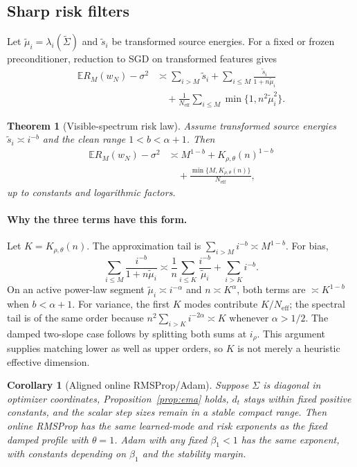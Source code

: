 \documentclass[letterpaper]{article} %
\newtheorem{theorem}{Theorem}
\newtheorem{corollary}{Corollary}
\newcommand{\E}{\mathbb{E}}
\newcommand{\tSig}{\widetilde\Sigma}
\newcommand{\tmu}{\widetilde\mu}
\newcommand{\ts}{\widetilde s}
\newcommand{\Neff}{N_{\mathrm{eff}}}
\newcommand{\Kvis}{K_{\rho,\theta}}
\begin{document}
\subsection{Sharp risk filters}

Let $\tmu_i=\lambda_i(\tSig)$ and $\ts_i$ be transformed source energies.  For a fixed or frozen preconditioner, reduction to SGD on transformed features gives
\begin{equation}
\label{eq:filter-law}
 \begin{aligned}
 \E R_M(w_N)-\sigma^2
 &\asymp \sum_{i>M}\ts_i
 +\sum_{i\le M}\frac{\ts_i}{1+n\tmu_i}\\
 &\quad+\frac1{\Neff}
 \sum_{i\le M}\min\{1,n^2\tmu_i^2\}.
 \end{aligned}
\end{equation}

\begin{theorem}[Visible-spectrum risk law]
\label{thm:risk}
Assume transformed source energies $\ts_i\asymp i^{-b}$ and the clean range $1<b<\alpha+1$.  Then
\[
 \begin{aligned}
 \E R_M(w_N)-\sigma^2
 &\asymp M^{1-b}+\Kvis(n)^{1-b}\\
 &\quad+\frac{\min\{M,\Kvis(n)\}}{\Neff},
 \end{aligned}
\]
up to constants and logarithmic factors.
\end{theorem}

\paragraph{Why the three terms have this form.}
Let $K=\Kvis(n)$.  The approximation tail is
$\sum_{i>M}i^{-b}\asymp M^{1-b}$.  For bias,
\[
 \sum_{i\le M}\frac{i^{-b}}{1+n\tmu_i}
 \asymp
 \frac1n\sum_{i\le K}\frac{i^{-b}}{\tmu_i}
 +\sum_{i>K}i^{-b}.
\]
On an active power-law segment $\tmu_i\asymp i^{-\alpha}$ and $n\asymp K^\alpha$, both terms are $\asymp K^{1-b}$ when $b<\alpha+1$.  For variance, the first $K$ modes contribute $K/\Neff$; the spectral tail is of the same order because
$n^2\sum_{i>K}i^{-2\alpha}\asymp K$ whenever $\alpha>1/2$.  The damped two-slope case follows by splitting both sums at $i_\rho$.  This argument supplies matching lower as well as upper orders, so $K$ is not merely a heuristic effective dimension.

\begin{corollary}[Aligned online RMSProp/Adam]
\label{cor:aligned-online}
Suppose $\Sigma$ is diagonal in optimizer coordinates, Proposition~\ref{prop:ema} holds, $d_t$ stays within fixed positive constants, and the scalar step sizes remain in a stable compact range.  Then online RMSProp has the same learned-mode and risk exponents as the fixed damped profile with $\theta=1$.  Adam with any fixed $\beta_1<1$ has the same exponent, with constants depending on $\beta_1$ and the stability margin.
\end{corollary}
\end{document}
